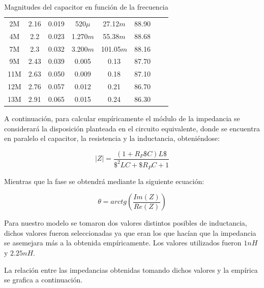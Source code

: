\begin{center}
\begin{table}[H]
{\begin{tabular}{ c c c c c c c c }
			2M   & 2.16 & 0.019 & 520$\mu$    & 27.12$m$ & 88.90 \\
			4M   & 2.2  & 0.023 & 1.270$m$   & 55.38$m$  & 88.68 \\
			7M   & 2.3  & 0.032 & 3.200$m$    & 101.05$m$ & 88.16 \\
			9M   & 2.43 & 0.039 & 0.005   & 0.13  & 87.70 \\
			11M  & 2.63 & 0.050 & 0.009   & 0.18   & 87.10 \\
			12M  & 2.76 & 0.057 & 0.012   & 0.21   & 86.70 \\
			13M  & 2.91 & 0.065 & 0.015   & 0.24   & 86.30 \\
            \hline 
        \end{tabular}
        }
        \caption{Magnitudes del capacitor en función de la frecuencia}
        \label{table:Rta_en_frecuencia_capacitor}
    \end{table}
\end{center}
A continuación, para calcular empíricamente el módulo de la impedancia se considerará la disposición planteada en el circuito equivalente, donde se encuentra en paralelo el capacitor, la resistencia y la inductancia, obteniéndose: 

\begin{equation}
|Z|= \frac{(1+R_P\$C)L\$}{\$^2LC+\$R_PC+1}
\end{equation}

Mientras que la fase se obtendrá mediante la siguiente ecuación:

\begin{equation}
\theta= arctg(\frac{Im(Z)}{Re(Z)})
\end{equation}

Para nuestro modelo se tomaron dos valores distintos posibles de inductancia, dichos valores fueron seleccionadas ya que eran los que hacían que la impedancia se asemejara más a la obtenida empíricamente. Los valores utilizados fueron $1nH$ y $2.25nH$.

La relación entre las impedancias obtenidas tomando dichos valores y la empírica se grafica a continuación.

